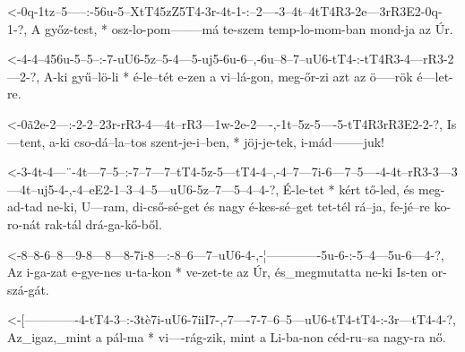   {<-0q-1tz--5-----:-56u-5--XtT45zZ5T4-3r-4t-1-:--2----3--4t--4tT4R3-2e---3rR3E2-0q-1-?,}
  {  A  győz-test, * osz-lo-pom--------má te-szem temp-lo-mom-ban    mond-ja     az Úr.}

  {<-4-4--456u-5--5--:-7-uU6-5z--5-4---5-uj5-6u-6--,-6u--8--7--uU6-tT4-:-tT4R3-4---rR3-2---2-?,}
  {  A-ki gyű--lö-li * é-le--tét e-zen a vi--lá-gon, meg-őr-zi azt az    ö-----rök é---let-re.}



  {<-0ã2e-2---:-2-2--23r-rR3-4---4t--rR3---1w-2e-2----,-1t--5z-5----5-tT4R3rR3E2-2-?,}
  {  Is---tent, a-ki cso-dá--la--tos szent-je-i--ben, * jöj-je-tek, i-mád--------juk!}


  {<-3-4t-4---¨-4t---7--5--:-7--7---7--tT4-5z-5---tT4-4--,-4--7---7i-6---7--5----4-4t--rR3-3---3---4t--uj5-4-,-4--eE2-1--3--4--5---uU6-5z--7---5--4--4-?,}
  {  É-le-tet * kért tő-led, és meg-ad-tad ne-ki, U---ram, di-cső-sé-get és nagy é-kes-sé--get tet-tél rá--ja, fe-jé--re ko-ro-nát rak-tál drá-ga-kő-ből.}

  {<-8--8-6--8---9-8---8---8-7i-8---:-8--6---7--uU6-4-,-¦-------------5u-6-:-5--4---5u-6---4-?,}
  {  Az i-ga-zat e-gye-nes u-ta-kon * ve-zet-te az Úr, és_megmutatta ne-ki  Is-ten or-szá-gát.}

  {<-[-------------4-tT4-3--:-3tè7i-uU6-7iiI7-,-7----7-7--6--5---uU6-tT4-tT4-:-3r---tT4-4-?,}
  {  Az_igaz,_mint a pál-ma * vi----rág-zik,    mint a Li-ba-non céd-ru--sa    nagy-ra  nő.}


